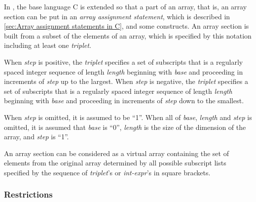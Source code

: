 In {\XMPC}, the base language C is extended so that a part of an array,
that is, an array section can be put in an {\it array assignment
statement}, which is described in \ref{sec:Array assignment statements
in C}, and some {\XMP} constructs. An array section is built from a
subset of the elements of an array, which is specified by this notation
including at least one {\it triplet}.

When {\it step} is positive, the {\it triplet} specifies a set of
subscripts that is a regularly spaced integer sequence of length {\it
length} beginning with {\it base} and proceeding in increments of {\it
step} up to the largest.
%
When {\it step} is negative, the {\it triplet} specifies a set of
subscripts that is a regularly spaced integer sequence of length {\it
length} beginning with {\it base} and proceeding in increments of {\it
step} down to the smallest.


When {\it step} is omitted, it is assumed to be ``1''.
%
When all of {\it base}, {\it length} and {\it step} is omitted, it is
assumed that {\it base} is ``0'', {\it length} is the size of the
dimension of the array, and {\it step} is ``1''.

An array section can be considered as a virtual array containing the set
of elements from the original array determined by all possible subscript
lists specified by the sequence of {\it triplet}'s or {\it int-expr}'s
in square brackets.

\subsubsection*{Restrictions}

